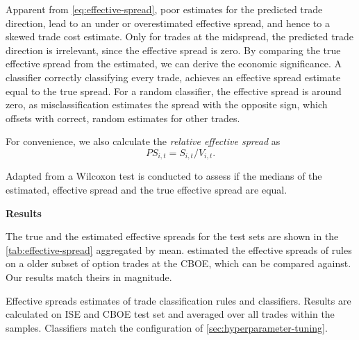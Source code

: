 Apparent from \cref{eq:effective-spread}, poor estimates for the predicted trade direction, lead to an under or overestimated effective spread, and hence to a skewed trade cost estimate. Only for trades at the midspread, the predicted trade direction is irrelevant, since the effective spread is zero. By comparing the true effective spread from the estimated, we can derive the economic significance. A classifier correctly classifying every trade, achieves an effective spread estimate equal to the true spread. For a random classifier, the effective spread is around zero, as misclassification estimates the spread with the opposite sign, which offsets with correct, random estimates for other trades.

For convenience, we also calculate the \emph{relative effective spread} as
\begin{equation}
    {PS}_{i,t} = S_{i,t} / V_{i,t}.
\end{equation}

Adapted from \textcite[][12]{theissenTestAccuracyLee2000} a Wilcoxon test is conducted to assess if the medians of the estimated, effective spread and the true effective spread are equal.

\textbf{Results}

The true and the estimated effective spreads for the test sets are shown in the \cref{tab:effective-spread} aggregated by mean. \textcite[][896--897]{savickasInferringDirectionOption2003} estimated the effective spreads of rules on a older subset of option trades at the \gls{CBOE}, which can be compared against. Our results match theirs in magnitude.

\begin{table}[!ht]
    \centering
    
    \caption[Effective Spreads Estimates]{Effective spreads estimates of trade classification rules and classifiers. Results are calculated on \gls{ISE} and \gls{CBOE} test set and averaged over all trades within the samples. Classifiers match the configuration of \cref{sec:hyperparameter-tuning}.}
    \label{tab:effective-spread}
\end{table}

